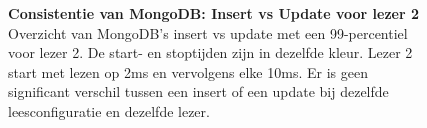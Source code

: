 \begin{figure}[ht!] 
	\centering
	\caption{\textbf{Consistentie van MongoDB: Insert vs Update voor lezer 2} \newline
	Overzicht van MongoDB's insert vs update met een 99-percentiel voor lezer 2. De start- en stoptijden zijn in dezelfde kleur. Lezer 2 start met lezen op 2ms en vervolgens elke 10ms. Er is geen significant verschil tussen een insert of een update bij dezelfde leesconfiguratie en dezelfde lezer.  }
	\label{fig:consistentie-mongodb-update-vs-insert}
\end{figure}


